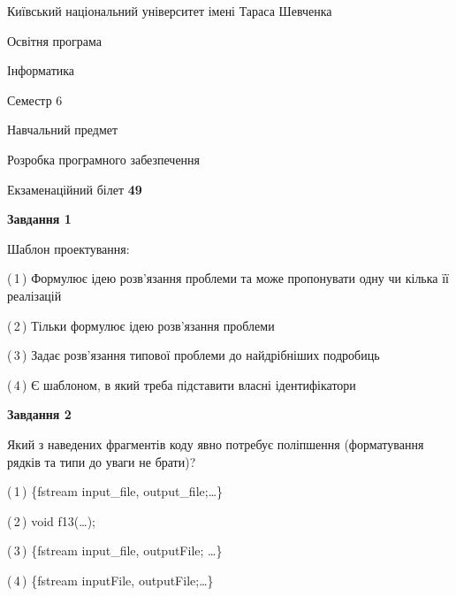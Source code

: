 \documentclass[10pt, ukrainian]{article}
\begin{document}
{{\begin {small}\par
{ \center  Київський національний університет імені Тараса Шевченка \par}
{\parbox {5 cm}{Освітня програма \hfill}{\parbox {7 cm}{Інформатика \hfill}}\parbox {6 cm}{\hfill Семестр 6}}\par
{\parbox {5 cm} {Навчальний предмет \hfill}\parbox {7 cm}{Розробка програмного забезпечення \hfill}\parbox {6cm}{\hfill}\par}\vspace{-7pt} \end{small}}{\center Екзаменаційний білет \No \textbf
{ 49 }\par}}
{
\begin {large}
{\begin {center}\textbf{Завдання 1}\end {center}}\par
Шаблон проектування:\par
\vspace{2mm}



(\,1\,) Формулює ідею розв'язання проблеми та може пропонувати одну чи кілька її реалізацій%



(\,2\,) Тільки формулює ідею розв'язання проблеми%



(\,3\,) Задає розв'язання типової проблеми до найдрібніших подробиць%



(\,4\,) Є шаблоном, в який треба підставити власні ідентифікатори%


{\begin {center}\textbf{Завдання 2}\end {center}}\par
Який з наведених фрагментів коду явно потребує поліпшення (форматування рядків та типи до уваги не брати)?\par
\vspace{2mm}



(\,1\,) \{fstream input\_file, output\_file;…\} %



(\,2\,) void f13(…);%



(\,3\,) \{fstream input\_file, outputFile; …\}%



(\,4\,) \{fstream inputFile, outputFile;…\} %



\end{large}}
\end{document}
